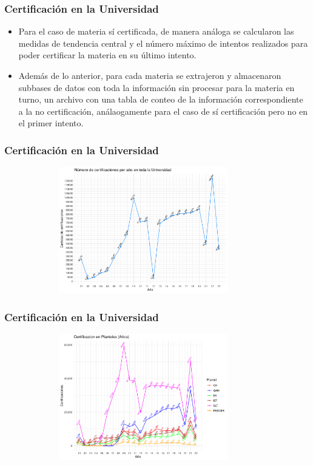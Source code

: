 \documentclass[xcolor=dvipsnames]{beamer}
\begin{document}
\begin{frame}\frametitle{Certificaci\'on en la Universidad}
\begin{itemize}

\item Para el caso de materia s\'i certificada, de manera an\'aloga se calcularon las medidas de tendencia central y el n\'umero m\'aximo de intentos realizados para poder certificar la materia en su \'ultimo intento. 



\item Adem\'as de lo anterior, para cada materia se extrajeron y almacenaron subbases de datos con toda la informaci\'on sin procesar para la materia en turno, un archivo con una tabla de conteo de la informaci\'on correspondiente a la no certificaci\'on, an\'alaogamente para el caso de s\'i certificaci\'on pero no en el primer intento. 


\end{itemize}






\end{frame}


\begin{frame}\frametitle{Certificaci\'on en la Universidad}
\textbf{
}
\begin{figure}[H]
\centering
\includegraphics[width=10cm,height=5.5cm]{Imagenes/graficoCertificacionesUACManual.pdf}
\end{figure}
\end{frame}

\begin{frame}\frametitle{Certificaci\'on en la Universidad}
\textbf{
}
\begin{figure}[H]
\centering
\includegraphics[width=10cm,height=5.5cm]{Imagenes/graficoCertificacionPlantelesAnhos.pdf}
\end{figure}
\end{frame}
\end{document}
